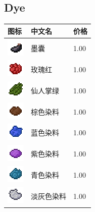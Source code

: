 \documentclass[UTF8]{ctexart}
\begin{document}
\subsection{Dye}
\begin{longtable}[]{|p{1cm}|p{8cm}|p{1.5cm}|}
\toprule
图标 & 中文名 & 价格\\
\midrule
	\includegraphics{.workspace/icons/minecraft/minecraft__dye__0.png} & 墨囊 &1.00\\
	\hline
	\includegraphics{.workspace/icons/minecraft/minecraft__dye__1.png} & 玫瑰红 &1.00\\
	\hline
	\includegraphics{.workspace/icons/minecraft/minecraft__dye__2.png} & 仙人掌绿 &1.00\\
	\hline
	\includegraphics{.workspace/icons/biomesoplenty/biomesoplenty__brown_dye__0.png} & 棕色染料 &1.00\\
	\hline
	\includegraphics{.workspace/icons/biomesoplenty/biomesoplenty__blue_dye__0.png} & 蓝色染料 &1.00\\
	\hline
	\includegraphics{.workspace/icons/minecraft/minecraft__dye__5.png} & 紫色染料 &1.00\\
	\hline
	\includegraphics{.workspace/icons/minecraft/minecraft__dye__6.png} & 青色染料 &1.00\\
	\hline
	\includegraphics{.workspace/icons/minecraft/minecraft__dye__7.png} & 淡灰色染料 &1.00\\

\end{longtable}
\end{document}
